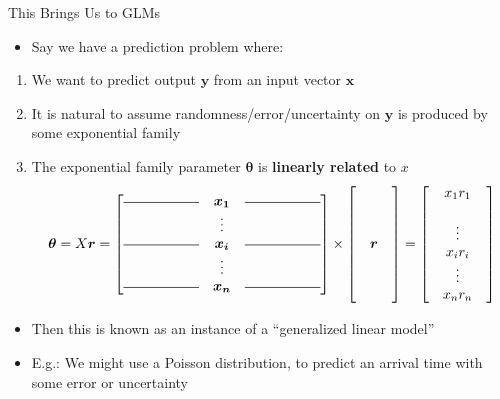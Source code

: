 \documentclass[aspectratio=169]{beamer}
\begin{document}
\begin{frame}{This Brings Us to GLMs}

\begin{itemize}
\item Say we have a prediction problem where:
\end{itemize}
\begin{enumerate}
\item  We want to predict output $\boldsymbol{y}$ from an input vector $\boldsymbol{x}$
\item  It is natural to assume randomness/error/uncertainty on $\boldsymbol{y}$ is produced by some exponential family
\item  The exponential family parameter $\boldsymbol{\theta}$ is \textbf{linearly related} to $x$%
{\small
\[
\boldsymbol{\theta} = X\boldsymbol{r} =  \begin{bmatrix} 
 \rule[.025in]{.75in}{0.5pt}	&\boldsymbol{x_1}  & \rule[.025in]{.75in}{0.5pt}	\\
	& $\vdots$ & 	\\
\rule[.025in]{.75in}{0.5pt}		&\boldsymbol{x_i} & \rule[.025in]{.75in}{0.5pt}		\\
	&$\vdots$  & 	\\
 \rule[.025in]{.75in}{0.5pt}	&\boldsymbol{x_n}  & \rule[.025in]{.75in}{0.5pt}	\\
\end{bmatrix} \times
 \begin{bmatrix} 
	 & & 	\\
	 &   & 	\\
	 &   & 	\\
	 & \boldsymbol{r} & 	\\
	 &   & 	\\
	 &  & 	\\
	 & & 	\\
\end{bmatrix} 
= \begin{bmatrix} 
	 & x_1r_1  & 	\\
	 & & \\
	 &  $\vdots$ & 	\\
	 & x_ir_i & 	\\
	 & $\vdots$ & 	\\
	 & x_n r_n& 	\\
\end{bmatrix} 
\]
}
\end{enumerate}
\begin{itemize}
\item Then this is known as an instance of a ``generalized linear model'' 
\item E.g.: We might use a Poisson distribution, to predict an arrival time with some error or uncertainty
\end{itemize}
\end{frame}
\end{document}
